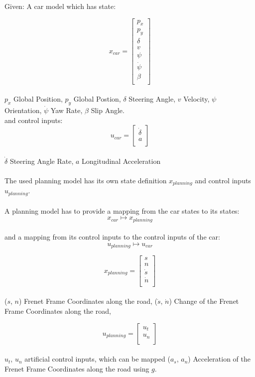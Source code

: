 Given: A car model which has state:

\[
	x_{car} = \begin{bmatrix}
		p_x        \\
		p_y        \\
		\delta     \\
		v          \\
		\psi       \\
		\dot{\psi} \\
		\beta      \\
	\end{bmatrix}
\]
\\
$p_x$ Global Position, $p_y$ Global Postion, $\delta$ Steering Angle, $v$ Velocity, $\psi$ Orientation, $\dot{\psi}$ Yaw Rate, $\beta$ Slip Angle.
\\
and control inputs:
\[
	u_{car} = \begin{bmatrix}
		\dot{\delta} \\
		a            \\
	\end{bmatrix}
\]
\\
$\dot{\delta}$ Steering Angle Rate, $a$ Longitudinal Acceleration
\\
\\
The used planning model has its own state definition $x_{planning}$ and control inputs $u_{planning}$.
\\
\\
A planning model has to provide a mapping from the car states to its states:
\[
	x_{car}\mapsto x_{planning}
\]
\\
and a mapping from its control inputs to the control inputs of the car:
\[
	u_{planning} \mapsto u_{car}
\]

\[
	x_{planning} = \begin{bmatrix}
		s       \\
		n       \\
		\dot{s} \\
		\dot{n} \\
	\end{bmatrix}
\]
\\
($s$, $n$) Frenet Frame Coordinates along the road, ($\dot{s}$, $\dot{n}$) Change of the Frenet Frame Coordinates along the road,

\[
	u_{planning} = \begin{bmatrix}
		u_t \\
		u_n \\
	\end{bmatrix}
\]
\\
$u_t$, $u_n$ artificial control inputs, which can be mapped ($a_{s}$, $a_{n}$) Acceleration of the Frenet Frame Coordinates along the road using $g$.

